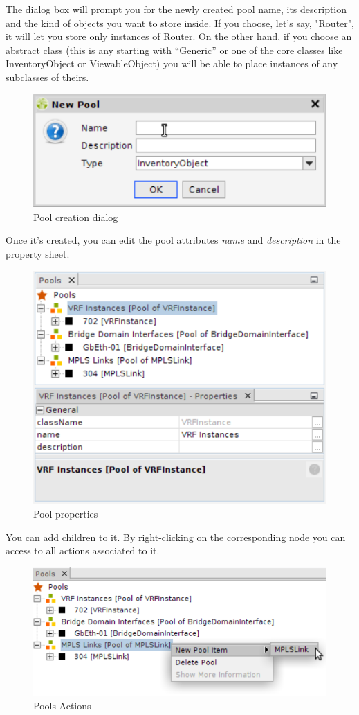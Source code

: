 \documentclass[a4paper]{article}
\begin{document}
	The dialog box will prompt you for the newly created pool name, its description and the kind of objects  you want to store inside. If you choose, let's say, "Router", it will let you store only instances of Router. On the other hand, if you choose an abstract class (this is any starting with “Generic” or one of the core classes like InventoryObject or ViewableObject) you will be able to place instances of any subclasses of theirs. 
	\begin{figure}[h!]
		\centering
		\includegraphics[width=0.5\linewidth]{img/pools_create_new_pool.png}
		\caption{Pool creation dialog}
		\label{fig:pools_create_new_pool}
	\end{figure}
	
	\newpage
	Once it's created, you can edit the pool attributes \textit{name} and \textit{description} in the property sheet.
	\begin{figure}[h!]
		\centering
		\includegraphics[width=0.5\linewidth]{img/pools_pool_properties.png}
		\caption{Pool properties}
		\label{fig:pools_pool_properties}
	\end{figure}
	
	You can add children to it. By right-clicking on the corresponding node you can access to all actions associated to it. 
	\begin{figure}[h!]
		\centering
		\includegraphics[width=0.5\linewidth]{img/pools_pool_action.png}
		\caption{Pools Actions}
		\label{fig:pools_pool_action}
	\end{figure}
	
\end{document}
